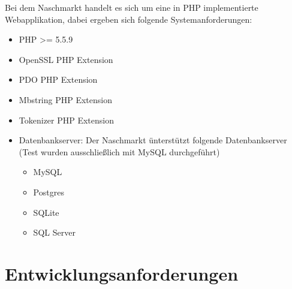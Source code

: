Bei dem Naschmarkt handelt es sich um eine in PHP implementierte Webapplikation, dabei ergeben sich folgende Systemanforderungen:
\begin{itemize}
    \item PHP >= 5.5.9
    \item OpenSSL PHP Extension
    \item PDO PHP Extension
    \item Mbstring PHP Extension
    \item Tokenizer PHP Extension
    \item Datenbankserver: Der Naschmarkt \"unterst\"utzt folgende Datenbankserver (Test wurden ausschlie\ss lich mit MySQL durchgef\"uhrt)
        \begin{itemize}
            \item MySQL
            \item Postgres
            \item SQLite
            \item SQL Server
        \end{itemize}
\end{itemize}

\section{Entwicklungsanforderungen}
